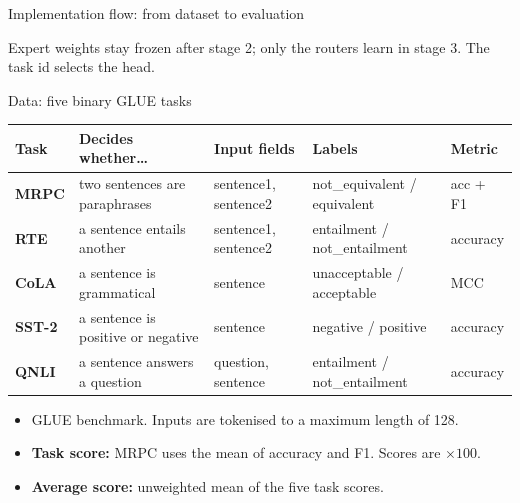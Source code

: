 \begin{frame}{Implementation flow: from dataset to evaluation}
  \vfill
  \raggedright
  {\footnotesize Expert weights stay frozen after stage 2; only the routers learn in stage 3. The task id selects the head.}
\end{frame}

\begin{frame}{Data: five binary GLUE tasks}
  \centering
  \footnotesize
  \renewcommand{\arraystretch}{1.25}
  \begin{tabularx}{\linewidth}{>{\bfseries}l X l l l}
    \toprule
    Task & Decides whether\ldots & Input fields & Labels & Metric\\
    \midrule
    MRPC & two sentences are paraphrases & sentence1, sentence2 & not\_equivalent / equivalent & acc + F1\\
    RTE & a sentence entails another & sentence1, sentence2 & entailment / not\_entailment & accuracy\\
    CoLA & a sentence is grammatical & sentence & unacceptable / acceptable & MCC\\
    SST-2 & a sentence is positive or negative & sentence & negative / positive & accuracy\\
    QNLI & a sentence answers a question & question, sentence & entailment / not\_entailment & accuracy\\
    \bottomrule
  \end{tabularx}
  \vfill
  \raggedright
  \begin{itemize}
    \item GLUE benchmark. Inputs are tokenised to a maximum length of 128.
    \item \textbf{Task score:} MRPC uses the mean of accuracy and F1. Scores are $\times 100$.
    \item \textbf{Average score:} unweighted mean of the five task scores.
  \end{itemize}
\end{frame}

